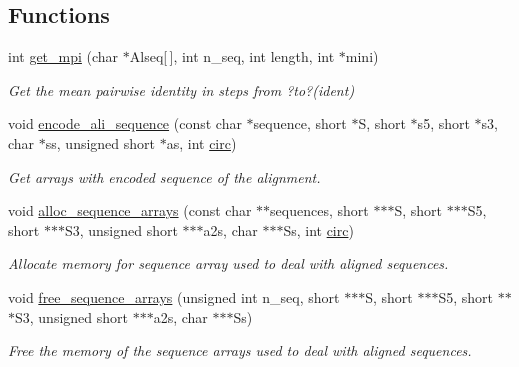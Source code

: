 \subsection*{Functions}
\begin{DoxyCompactItemize}
\item 
int \hyperlink{group__aln__utils__deprecated_gaa2d600be90844094ec145ea14a314d2f}{get\+\_\+mpi} (char $\ast$Alseq\mbox{[}$\,$\mbox{]}, int n\+\_\+seq, int length, int $\ast$mini)
\begin{DoxyCompactList}\small\item\em Get the mean pairwise identity in steps from ?to?(ident) \end{DoxyCompactList}\item 
void \hyperlink{group__aln__utils__deprecated_gaa3e40277c837d6f7603afe319884c786}{encode\+\_\+ali\+\_\+sequence} (const char $\ast$sequence, short $\ast$S, short $\ast$s5, short $\ast$s3, char $\ast$ss, unsigned short $\ast$as, int \hyperlink{group__model__details_gaf9202a1a09f5828dc731e2d9a10fa111}{circ})
\begin{DoxyCompactList}\small\item\em Get arrays with encoded sequence of the alignment. \end{DoxyCompactList}\item 
void \hyperlink{group__aln__utils__deprecated_ga8a560930f7f2582cc3967723a86cfdfa}{alloc\+\_\+sequence\+\_\+arrays} (const char $\ast$$\ast$sequences, short $\ast$$\ast$$\ast$S, short $\ast$$\ast$$\ast$S5, short $\ast$$\ast$$\ast$S3, unsigned short $\ast$$\ast$$\ast$a2s, char $\ast$$\ast$$\ast$Ss, int \hyperlink{group__model__details_gaf9202a1a09f5828dc731e2d9a10fa111}{circ})
\begin{DoxyCompactList}\small\item\em Allocate memory for sequence array used to deal with aligned sequences. \end{DoxyCompactList}\item 
void \hyperlink{group__aln__utils__deprecated_ga298a420a8c879202e2617b3f724fde38}{free\+\_\+sequence\+\_\+arrays} (unsigned int n\+\_\+seq, short $\ast$$\ast$$\ast$S, short $\ast$$\ast$$\ast$S5, short $\ast$$\ast$$\ast$S3, unsigned short $\ast$$\ast$$\ast$a2s, char $\ast$$\ast$$\ast$Ss)
\begin{DoxyCompactList}\small\item\em Free the memory of the sequence arrays used to deal with aligned sequences. \end{DoxyCompactList}\end{DoxyCompactItemize}


